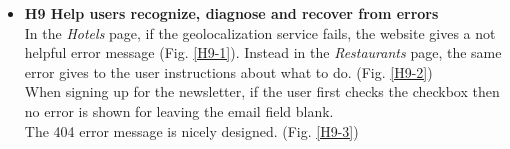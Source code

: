 \begin{itemize}
        \begin{figure}[!ht]
            \begin{minipage}[c]{\linewidth}
                \centering
                \captionsetup{justification=centering}
                \caption{}
                \label{H8-1}
            \end{minipage}
        \end{figure}
        \begin{figure}[!ht]
            \begin{minipage}[c]{\linewidth}
                \centering
                \captionsetup{justification=centering}
                \caption{}
                \label{H8-2}
            \end{minipage}
        \end{figure}
    \pagebreak
    \item \textbf{H9 Help users recognize, diagnose and recover from errors}\\
        In the \emph{Hotels} page, if the geolocalization service fails, the website gives a not helpful error message (Fig. \ref{H9-1}). Instead in the \emph{Restaurants} page, the same error gives to the user instructions about what to do. (Fig. \ref{H9-2})\\
        When signing up for the newsletter, if the user first checks the checkbox then no error is shown for leaving the email field blank.\\
        The 404 error message is nicely designed. (Fig. \ref{H9-3})\\

\end{itemize}
